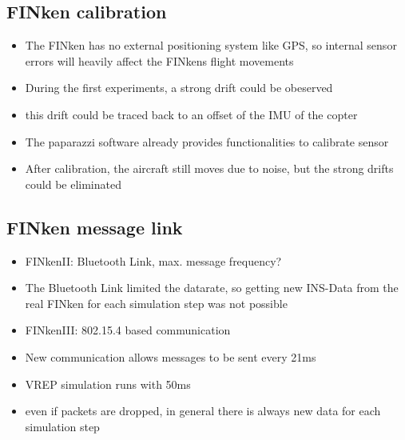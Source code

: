 \subsection{FINken calibration}
\begin{itemize}
\item{The FINken has no external positioning system like GPS, so internal sensor errors will heavily affect the FINkens flight movements}
\item{During the first experiments, a strong drift could be obeserved}
\item{this drift could be traced back to an offset of the IMU of the copter }
\item{The paparazzi software already provides functionalities to calibrate sensor }
\item{After calibration, the aircraft still moves due to noise, but the strong drifts could be eliminated}
\end{itemize}
\subsection{FINken message link}
\label{sec:messLink}
\begin{itemize}
\item{FINkenII: Bluetooth Link, max. message frequency?}
\item{The Bluetooth Link limited the datarate, so getting new INS-Data from the real FINken for each simulation step was not possible}
\item{FINkenIII: 802.15.4 based communication}
\item{New communication allows messages to be sent every 21ms}
\item{VREP simulation runs with 50ms}
\item{even if packets are dropped, in general there is always new data for each simulation step}
\end{itemize}
